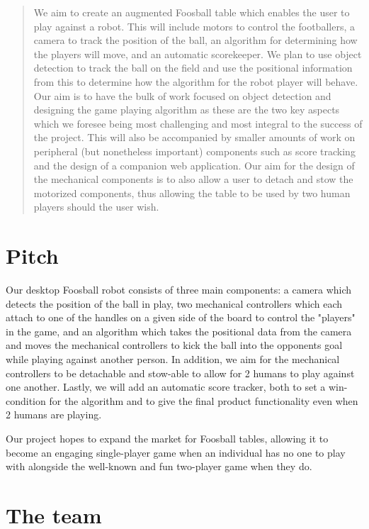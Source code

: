 \documentclass{article}
\begin{document}
 


\begin{abstract} 
We aim to create an augmented Foosball table which enables the user to play against a robot. This will include motors to control the footballers, a camera to track the position of the ball, an algorithm for determining how the players will move, and an automatic scorekeeper. We plan to use object detection to track the ball on the field and use the positional information from this to determine how the algorithm for the robot player will behave. Our aim is to have the bulk of work focused on object detection and designing the game playing algorithm as these are the two key aspects which we foresee being most challenging and most integral to the success of the project. This will also be accompanied by smaller amounts of work on peripheral (but nonetheless important) components such as score tracking and the design of a companion web application. Our aim for the design of the mechanical components is to also allow a user to detach and stow the motorized components, thus allowing the table to be used by two human players should the user wish.
\end{abstract} 

\section{Pitch} 
Our desktop Foosball robot consists of three main components: a camera which detects the position of the ball in play, two mechanical controllers which each attach to one of the handles on a given side of the board to control the "players" in the game, and an algorithm which takes the positional data from the camera and moves the mechanical controllers to kick the ball into the opponents goal while playing against another person. In addition, we aim for the mechanical controllers to be detachable and stow-able to allow for 2 humans to play against one another. Lastly, we will add an automatic score tracker, both to set a win-condition for the algorithm and to give the final product functionality even when 2 humans are playing.

Our project hopes to expand the market for Foosball tables, allowing it to become an engaging single-player game when an individual has no one to play with alongside the well-known and fun two-player game when they do. 

\section{The team} 
\end{document}
